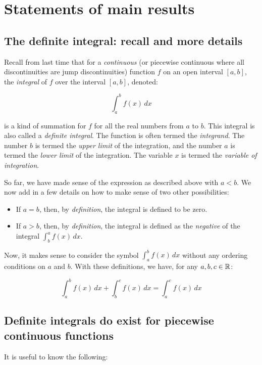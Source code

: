 \documentclass[10pt]{amsart}
\begin{document}
\section{Statements of main results}

\subsection{The definite integral: recall and more details}

Recall from last time that for a {\em continuous} (or piecewise
continuous where all discontinuities are jump discontinuities)
function $f$ on an open interval $[a,b]$, the {\em integral} of $f$
over the interval $[a,b]$, denoted:

$$\int_a^b f(x) \, dx$$

is a kind of summation for $f$ for all the real numbers from $a$ to
$b$. This integral is also called a {\em definite integral}. The
function is often termed the {\em integrand}. The number $b$ is termed
the {\em upper limit} of the integration, and the number $a$ is termed
the {\em lower limit} of the integration. The variable $x$ is termed
the {\em variable of integration}.

So far, we have made sense of the expression as described above with
$a < b$. We now add in a few details on how to make sense of two other
possibilities:

\begin{itemize}
\item If $a = b$, then, by {\em definition}, the integral is defined
  to be zero.
\item If $a > b$, then, by {\em definition}, the integral is defined
  as the {\em negative} of the integral $\int_b^a f(x) \, dx$.
\end{itemize}

Now, it makes sense to consider the symbol $\int_a^b f(x) \, dx$
without any ordering conditions on $a$ and $b$. With these
definitions, we have, for any $a,b,c \in \mathbb{R}$:

$$\int_a^b f(x) \, dx + \int_b^c f(x) \, dx = \int_a^c f(x) \, dx$$

\subsection{Definite integrals do exist for piecewise continuous functions}

It is useful to know the following:
\end{document}
